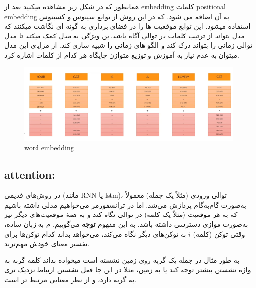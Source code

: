 همانطور که در شکل زیر مشاهده میکنید بعد از embedding  کلمات  positional embedding  به آن اضافه می شود.
که در این روش از توابع سینوس و کسینوس استفاده میشود.
این توابع موقعیت ها را در فضای برداری به گونه ای نگاشت میکنند که مدل بتواند از ترتیب کلمات در توالی آگاه باشد.این ویژگی به مدل کمک میکند تا مدل توالی زمانی را بتواند درک کند و الگو های زمانی را شبیه سازی کند.
از مزایای این مدل میتوان به عدم نیاز به آموزش و توزیع متوازن جایگاه هر کدام از کلمات اشاره کرد.


\begin{figure}[h]
	\centering
	\begin{minipage}[b]{0.7\textwidth}
		\centering
		\includegraphics[width=\textwidth]{transformer_images/positional_embedding.png}
		\caption{word embedding}
		\label{fig:word embedding + positional embedding}
	\end{minipage}
	\hfill
	
\end{figure}






\subsection{attention:}



در روش‌های قدیمی (مانند RNN یا lstm)، توالی ورودی (مثلاً یک جمله) معمولاً به‌صورت گام‌به‌گام پردازش می‌شد. اما در ترانسفورمر می‌خواهیم مدلی داشته باشیم که به هر موقعیت (مثلاً یک کلمه) در توالی نگاه کند و به همهٔ موقعیت‌های دیگر نیز به‌صورت موازی دسترسی داشته باشد. به این مفهوم \textbf{توجه} می‌گوییم.
م
به زبان ساده، وقتی توکن (کلمه) $i$ به توکن‌های دیگر نگاه می‌کند، می‌خواهد بداند کدام توکن‌ها برای تفسیر معنای خودش مهم‌ترند.

به طور مثال در جمله  یک گربه روی زمین نشسته است میخواده بداند کلمه گربه به واژه نشستن بیشتر توجه کند یا به زمین، مثلا در این جا فعل نشستن ارتباط نزدیک تری به گربه دارد، و از نظر معنایی مرتبط تر است.




